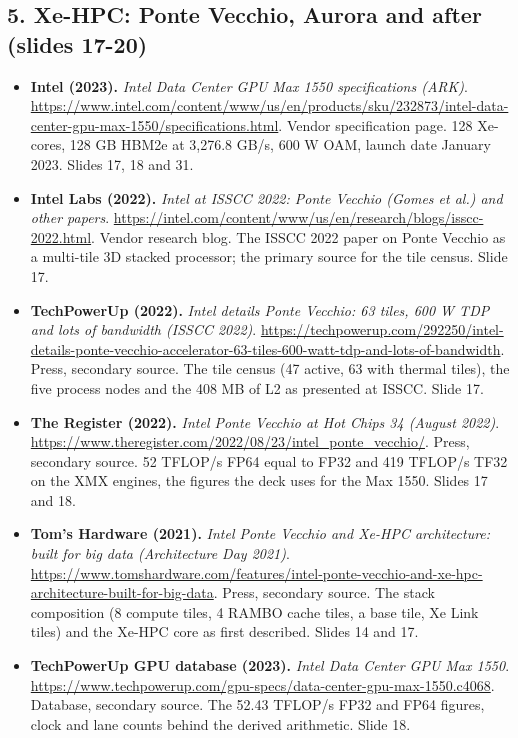 \documentclass[11pt,letterpaper]{article}
\begin{document}
\subsection*{5. Xe-HPC: Ponte Vecchio, Aurora and after (slides 17-20)}
\begin{itemize}[leftmargin=1.2em,itemsep=3pt]\sloppy
\item \textbf{Intel (2023).} \textit{Intel Data Center GPU Max 1550 specifications (ARK)}. \url{https://www.intel.com/content/www/us/en/products/sku/232873/intel-data-center-gpu-max-1550/specifications.html}. Vendor specification page. 128 Xe-cores, 128 GB HBM2e at 3,276.8 GB/s, 600 W OAM, launch date January 2023. Slides 17, 18 and 31.
\item \textbf{Intel Labs (2022).} \textit{Intel at ISSCC 2022: Ponte Vecchio (Gomes et al.) and other papers}. \url{https://intel.com/content/www/us/en/research/blogs/isscc-2022.html}. Vendor research blog. The ISSCC 2022 paper on Ponte Vecchio as a multi-tile 3D stacked processor; the primary source for the tile census. Slide 17.
\item \textbf{TechPowerUp (2022).} \textit{Intel details Ponte Vecchio: 63 tiles, 600 W TDP and lots of bandwidth (ISSCC 2022)}. \url{https://techpowerup.com/292250/intel-details-ponte-vecchio-accelerator-63-tiles-600-watt-tdp-and-lots-of-bandwidth}. Press, secondary source. The tile census (47 active, 63 with thermal tiles), the five process nodes and the 408 MB of L2 as presented at ISSCC. Slide 17.
\item \textbf{The Register (2022).} \textit{Intel Ponte Vecchio at Hot Chips 34 (August 2022)}. \url{https://www.theregister.com/2022/08/23/intel_ponte_vecchio/}. Press, secondary source. 52 TFLOP/s FP64 equal to FP32 and 419 TFLOP/s TF32 on the XMX engines, the figures the deck uses for the Max 1550. Slides 17 and 18.
\item \textbf{Tom's Hardware (2021).} \textit{Intel Ponte Vecchio and Xe-HPC architecture: built for big data (Architecture Day 2021)}. \url{https://www.tomshardware.com/features/intel-ponte-vecchio-and-xe-hpc-architecture-built-for-big-data}. Press, secondary source. The stack composition (8 compute tiles, 4 RAMBO cache tiles, a base tile, Xe Link tiles) and the Xe-HPC core as first described. Slides 14 and 17.
\item \textbf{TechPowerUp GPU database (2023).} \textit{Intel Data Center GPU Max 1550}. \url{https://www.techpowerup.com/gpu-specs/data-center-gpu-max-1550.c4068}. Database, secondary source. The 52.43 TFLOP/s FP32 and FP64 figures, clock and lane counts behind the derived arithmetic. Slide 18.

\end{itemize}
\end{document}
